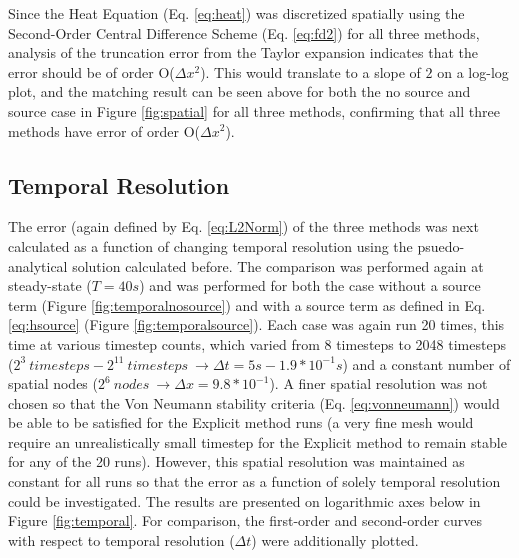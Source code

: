 \documentclass[10pt, letter, showtrims]{extarticle}
\begin{document}
		\noindent
		Since the Heat Equation (Eq. \ref{eq:heat}) was discretized spatially using the Second-Order Central Difference Scheme (Eq. \ref{eq:fd2}) for all three methods, analysis of the truncation error from the Taylor expansion indicates that the error should be of order O($\Delta x^{2}$). This would translate to a slope of $2$ on a log-log plot, and the matching result can be seen above for both the no source and source case in Figure \ref{fig:spatial} for all three methods, confirming that all three methods have error of order O($\Delta x^{2}$).	
		
		\pagebreak
		
		\subsection{Temporal Resolution}

		\noindent
		The error (again defined by Eq. \ref{eq:L2Norm}) of the three methods was next calculated as a function of changing temporal resolution using the psuedo-analytical solution calculated before. The comparison was performed again at steady-state ($T = 40 s$) and was performed for both the case without a source term (Figure \ref{fig:temporalnosource}) and with a source term as defined in Eq. \ref{eq:hsource} (Figure \ref{fig:temporalsource}). Each case was again run 20 times, this time at various timestep counts, which varied from 8 timesteps to 2048 timesteps ($2^{3}\ timesteps - 2^{11}\ timesteps\ \rightarrow	\Delta t = 5 s - 1.9 * 10^{-1} s$) and a constant number of spatial nodes ($2^{6}\ nodes\ \rightarrow \Delta x = 9.8*10^{-1} $). A finer spatial resolution was not chosen so that the Von Neumann stability criteria (Eq. \ref{eq:vonneumann}) would be able to be satisfied for the Explicit method runs (a very fine mesh would require an unrealistically small timestep for the Explicit method to remain stable for any of the 20 runs). However, this spatial resolution was maintained as constant for all runs so that the error as a function of solely temporal resolution could be investigated. The results are presented on logarithmic axes below in Figure \ref{fig:temporal}. For comparison, the first-order and second-order curves with respect to temporal resolution ($\Delta t$) were additionally plotted.
		
\end{document}
